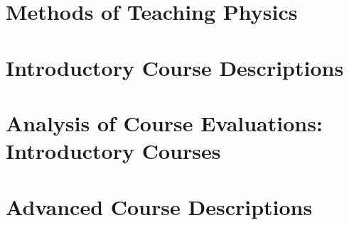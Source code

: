 \documentclass[../../main.tex]{subfiles}
\begin{document}
\begin{flushleft}

\end{flushleft}

\section{Methods of Teaching Physics}
\label{sec:methods}

%

\begin{flushleft}

\end{flushleft}

\section{Introductory Course Descriptions}
\label{sec:intro}

%

\begin{flushleft}

\end{flushleft}

\section{Analysis of Course Evaluations: Introductory Courses}
\label{sec:intro_eval}

%

\begin{flushleft}

\end{flushleft}

\section{Advanced Course Descriptions}
\label{sec:adv}

%
\end{document}
